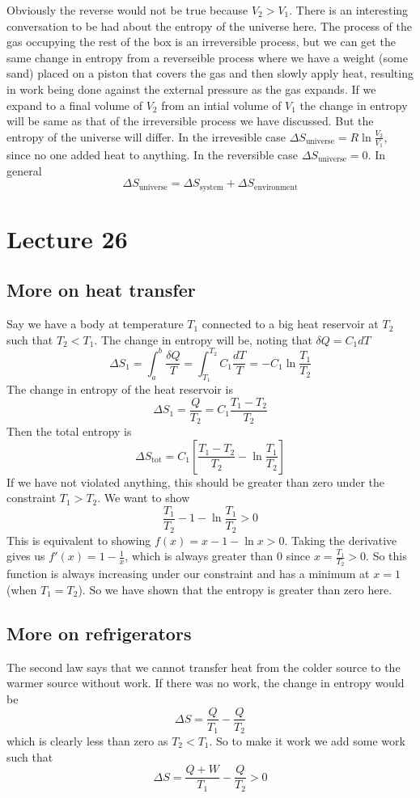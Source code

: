 \documentclass{report}
\numberwithin{equation}{section}
\begin{document}
Obviously the reverse would not be true because $V_2 > V_1$. There is an interesting conversation to be had about the entropy of the universe here. The process of the gas occupying the rest of the box is an 
irreversible process, but we can get the same change in entropy from a reverseible process where we have a weight (some sand) placed on a piston that covers the gas and then slowly apply heat, resulting in work being done against the external pressure as the gas expands. If we expand to a final volume of $V_2$ from an intial volume of $V_1$ the change in entropy will be same as that of the irreversible process we have discussed. But the entropy 
of the universe will differ. In the irrevesible case $\Delta S_{\text{universe}} = R\ln\frac{V_2}{V_1}$, since no one added heat to anything. In the reversible case $\Delta S_{\text{universe}} = 0$. In general 
\begin{equation}
    \Delta S_{\text{universe}} = \Delta S_{\text{system}} + \Delta S_{\text{environment}}
\end{equation}
\section{Lecture 26}
\subsection{More on heat transfer}
Say we have a body at temperature $T_1$ connected to a big heat reservoir at $T_2$ such that $T_2<T_1$. The change in entropy will be, noting that $\delta Q = C_1 dT$
$$\Delta S_1 = \int^b_a \frac{\delta Q}{T} = \int^{T_2}_{T_1}C_1\frac{dT}{T} = -C_1\ln\frac{T_1}{T_2}$$
The change in entropy of the heat reservoir is 
$$\Delta S_1 = \frac{Q}{T_2} = C_1\frac{T_1-T_2}{T_2}$$
Then the total entropy is 
$$\Delta S_{\text{tot}} = C_1\left[\frac{T_1-T_2}{T_2}-\ln\frac{T_1}{T_2}\right]$$
If we have not violated anything, this should be greater than zero under the constraint $T_1>T_2$. We want to show 
$$\frac{T_1}{T_2}-1-\ln\frac{T_1}{T_2}>0$$
This is equivalent to showing $f(x) = x-1-\ln x>0$. Taking the derivative gives us $f'(x) = 1-\frac{1}{x}$, which is always greater than $0$ since $x=\frac{T_1}{T_2}>0$. So this function is always 
increasing under our constraint and has a minimum at $x=1$ (when $T_1 = T_2$). So we have shown that the entropy is greater than zero here.
\subsection{More on refrigerators}
The second law says that we cannot transfer heat from the colder source to the warmer source without work. If there was no work, the change in entropy would be 
$$\Delta S = \frac{Q}{T_1}-\frac{Q}{T_2}$$
which is clearly less than zero as $T_2<T_1$. So to make it work we add some work such that 
$$\Delta S = \frac{Q+W}{T_1} -\frac{Q}{T_2}>0$$
\end{document}
